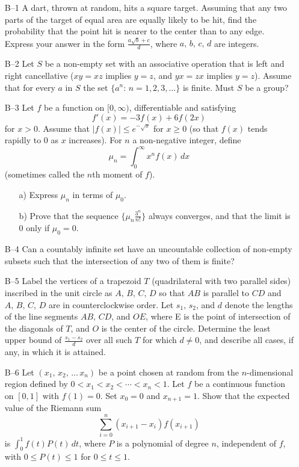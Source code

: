 \documentclass[amssymb,twocolumn,pra,10pt,aps]{revtex4-1}
\begin{document}
\begin{itemize}
\item[B--1]
A dart, thrown at random, hits a square target. Assuming that any two
parts of the target of equal area are equally likely to be hit, find
the probability that the point hit is nearer to the center than to any
edge. Express your answer in the form $\displaystyle{\frac{a\sqrt{b} + c}{d}}$,
where $a,\,b,\,c,\,d$ are integers.

\item[B--2]
Let $S$ be a non-empty set with an associative operation that is left and
right cancellative ($xy=xz$ implies $y=z$, and $yx=zx$ implies $y=z$).
Assume that for every $a$ in $S$ the set $\{a^n:\,n=1, 2, 3, \ldots\}$ is
finite. Must $S$ be a group?

\item[B--3]
Let $f$ be a function on $[0,\infty)$, differentiable and satisfying
\[
f'(x)=-3f(x)+6f(2x)
\]
for $x>0$. Assume that $|f(x)|\le e^{-\sqrt{x}}$ for $x\ge 0$ (so that
$f(x)$ tends rapidly to $0$ as $x$ increases).
For $n$ a non-negative integer, define
\[
\mu_n=\int_0^\infty x^n f(x)\,dx
\]
(sometimes called the $n$th moment of $f$).
\begin{enumerate}
\item[a)] Express $\mu_n$ in terms of $\mu_0$.
\item[b)] Prove that the sequence $\{\mu_n \frac{3^n}{n!}\}$ always converges,
and that the limit is $0$ only if $\mu_0=0$.
\end{enumerate}

\item[B--4]
Can a countably infinite set have an uncountable collection of
non-empty subsets such that the intersection of any two of them is
finite?

\item[B--5]
Label the vertices of a trapezoid $T$ (quadrilateral with two parallel sides)
inscribed in the unit circle as $A,\,B,\,C,\,D$ so that $AB$ is parallel to
$CD$ and $A,\,B,\,C,\,D$ are in counterclockwise order. Let
$s_1,\,s_2$, and $d$ denote the lengths of the line segments
$AB,\, CD$, and $OE$, where E  is the point of intersection of the diagonals
of $T$, and $O$ is the center of the circle. Determine the least upper bound of
$\frac{s_1-s_2}{d}$ over all such $T$ for which $d\ne 0$, and describe all
cases, if any, in which it is attained.

\item[B--6]
Let $(x_1,\,x_2,\,\ldots\,x_n)$ be a point chosen at random from the
$n$-dimensional region defined by
$0<x_1<x_2<\cdots < x_n<1.$  Let $f$ be a continuous function on
$[0,1]$ with $f(1)=0$.
Set $x_0=0$ and $x_{n+1}=1$. Show that the expected value of the
Riemann sum
\[
\sum_{i=0}^n (x_{i+1}-x_i) f(x_{i+1})
\]
is $\int_0^1 f(t)P(t)\, dt$, where $P$ is a polynomial of degree $n$,
independent of $f$, with $0\le P(t)\le 1$ for $0\le t \le 1$.

\end{itemize}
\end{document}

